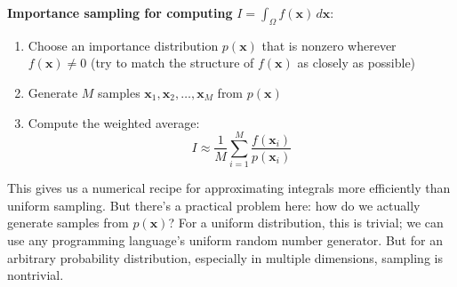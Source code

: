 \begin{algorithmBox}
    \textbf{Importance sampling for computing} $I = \int_{\Omega} f(\mathbf{x}) \, d\mathbf{x}$:
    \begin{enumerate}
        \item Choose an importance distribution $p(\mathbf{x})$ that is nonzero wherever $f(\mathbf{x}) \neq 0$ (try to match the structure of $f(\mathbf{x})$ as closely as possible)
        \item Generate $M$ samples $\mathbf{x}_1, \mathbf{x}_2, \ldots, \mathbf{x}_M$ from $p(\mathbf{x})$
        \item Compute the weighted average:
        \begin{equation}
            I \approx \frac{1}{M} \sum_{i=1}^{M} \frac{f(\mathbf{x}_i)}{p(\mathbf{x}_i)}
        \end{equation}
    \end{enumerate}
\end{algorithmBox}


This gives us a numerical recipe for approximating integrals more efficiently than uniform sampling. But there's a practical problem here: how do we actually generate samples from $p(\mathbf{x})$? For a uniform distribution, this is trivial; we can use any programming language's uniform random number generator. But for an arbitrary probability distribution, especially in multiple dimensions, sampling is nontrivial.

